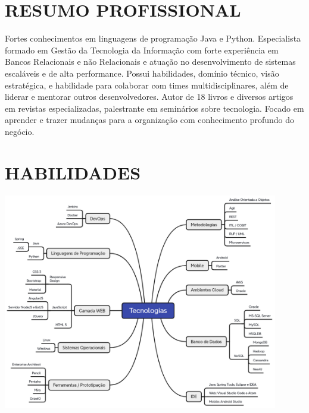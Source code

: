 \documentclass{res}
\begin{document}
	
	\thispagestyle{empty} %
	\address{{\bf Brasil - DF - Brasília} -- Jardim Botânico -- 71680-389 \\
		Tel. (61) 99874.0763 -- fernando.anselmo74@gmail.com}
	
	\begin{resume}
		
		\section{RESUMO PROFISSIONAL}
		\vspace{8pt}
		Fortes conhecimentos em linguagens de programação Java e Python. Especialista formado em Gestão da Tecnologia da Informação com forte experiência em Bancos Relacionais e não Relacionais e atuação no desenvolvimento de sistemas escaláveis e de alta performance. Possui habilidades, domínio técnico, visão estratégica, e habilidade para colaborar com times multidisciplinares, além de liderar e mentorar outros desenvolvedores. Autor de 18 livros e diversos artigos em revistas especializadas, palestrante em seminários sobre tecnologia. Focado em aprender e trazer mudanças para a organização com conhecimento profundo do negócio.
		
		\section{HABILIDADES}
		\vspace{8pt}
		\includegraphics[width=0.9\textwidth]{imagens/tecnologias.png}
		

\end{resume}
\end{document}
